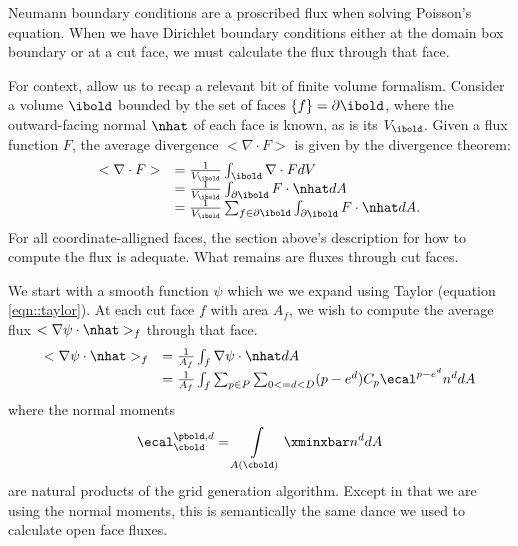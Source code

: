 \documentclass{article}
\begin{document}
{Neumann boundary conditions are a proscribed flux when solving
Poisson's equation.     When we have Dirichlet boundary conditions
either at the domain box boundary or at a cut face, we must calculate
the flux through that face.

For context, allow us to recap a relevant bit of finite volume formalism.
Consider a volume $\ibold$ bounded by the set of faces
$\{f\}  = \partial \ibold$, where the outward-facing normal $\nhat$ of
each face is known, as is its  $V_\ibold$.
Given a flux function $F$, the average divergence $< \nabla \cdot F >$
is given by the divergence theorem:
\begin{equation}
\begin{array}{l l}
< \nabla \cdot F > &= \frac{1}{V_\ibold} \int_\ibold \nabla \cdot F dV \\
           &= \frac{1}{V_\ibold} \int_{\partial \ibold} F\cdot \nhat dA \\
           &= \frac{1}{V_\ibold} \sum_{f \in \partial
  \ibold}\int_{\partial \ibold} F\cdot \nhat dA.
\end{array}
\label{eqn::discreteDivergence}
\end{equation}
For all coordinate-alligned faces, the section above's description for how to
compute the flux is adequate.   What remains are fluxes through cut
faces.

We start with a smooth function $\psi$ which we we expand using Taylor
(equation \ref{eqn::taylor}).  At each cut face $f$ with area $A_f$,
we wish to compute the average flux $< \nabla \psi \cdot \nhat >_f$
through that face.
\begin{equation}
\begin{array}{l l }
  < \nabla \psi \cdot \nhat >_f
  &= \frac{1}{A_f} \int_f \nabla \psi \cdot \nhat dA \\
  &= \frac{1}{A_f} \int_f \sum_{p \in P} \sum_{0 <= d <D}  (p-e^d) C_p
  \ecal^{p-e^d} n^d dA
\end{array}
\end{equation}
where the normal moments
\begin{equation}
\ecal^{\pbold, d}_\cbold  =  \int\limits_{A(\cbold)} \xminxbar n^d  dA
\end{equation}
are natural products of the \cite{Schwartz2015} grid generation
algorithm.   Except in that we are using the normal moments, this is
semantically the same dance we used to calculate open face fluxes.

}
\end{document}
